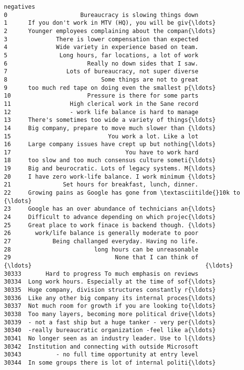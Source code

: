\documentclass[11pt]{article}
\begin{document}
\begin{tcolorbox}[breakable, boxrule=.5pt, size=fbox, pad at break*=1mm, opacityfill=0]
\begin{Verbatim}[commandchars=\\\{\}]
                                               negatives
0                     Bureaucracy is slowing things down
1      If you don't work in MTV (HQ), you will be giv{\ldots}
2      Younger employees complaining about the compan{\ldots}
3              There is lower compensation than expected
4              Wide variety in experience based on team.
5               Long hours, far locations, a lot of work
6                       Really no down sides that I saw.
7                 Lots of bureaucracy, not super diverse
8                           Some things are not to great
9      too much red tape on doing even the smallest p{\ldots}
10                      Pressure is there for some parts
11                 High clerical work in the Sane record
12                 - work life balance is hard to manage
13     There's sometimes too wide a variety of things{\ldots}
14     Big company, prepare to move much slower than {\ldots}
15                            You work a lot. Like a lot
16     Large company issues have crept up but nothing{\ldots}
17                                 You have to work hard
18     too slow and too much consensus culture someti{\ldots}
19     Big and beurocratic. Lots of legacy systems. M{\ldots}
20     I have zero work-life balance. I work minimum {\ldots}
21               Set hours for breakfast, lunch, dinner.
22     Growing pains as Google has gone from \textasciitilde{}10k to {\ldots}
23     Google has an over abundance of technicians an{\ldots}
24     Difficult to advance depending on which projec{\ldots}
25     Great place to work finace is backend though. {\ldots}
26       work/life balance is generally moderate to poor
27            Being challanged everyday. Having no life.
28                        long hours can be unreasonable
29                              None that I can think of
{\ldots}                                                  {\ldots}
30333       Hard to progress To much emphasis on reviews
30334  Long work hours. Especially at the time of sof{\ldots}
30335  Huge company, division structures constantly r{\ldots}
30336  Like any other big company its internal proces{\ldots}
30337  Not much room for growth if you are looking to{\ldots}
30338  Too many layers, becoming more political drive{\ldots}
30339  - not a fast ship but a huge tanker - very per{\ldots}
30340  -really bureaucratic organization -feel like a{\ldots}
30341  No longer seen as an industry leader. Use to l{\ldots}
30342  Institution and connecting with outside Microsoft
30343          - no full time opportunity at entry level
30344  In some groups there is lot of internal politi{\ldots}

\end{Verbatim}
\end{tcolorbox}
\end{document}
